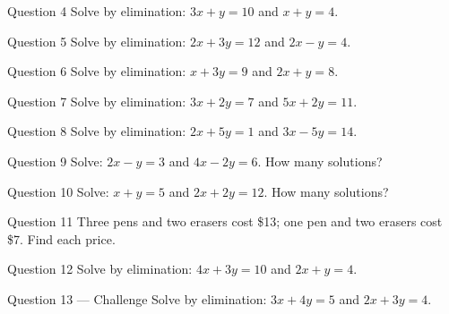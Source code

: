 \documentclass[11pt]{article}
\begin{document}
\begin{qbox}{Question 4}
Solve by elimination: $3x+y=10$ and $x+y=4$.\workspace{2.4cm}
\end{qbox}

\begin{qbox}{Question 5}
Solve by elimination: $2x+3y=12$ and $2x-y=4$.\workspace{2.6cm}
\end{qbox}

\begin{qbox}{Question 6}
Solve by elimination: $x+3y=9$ and $2x+y=8$.\workspace{2.6cm}
\end{qbox}

\begin{qbox}{Question 7}
Solve by elimination: $3x+2y=7$ and $5x+2y=11$.\workspace{2.4cm}
\end{qbox}

\begin{qbox}{Question 8}
Solve by elimination: $2x+5y=1$ and $3x-5y=14$.\workspace{2.4cm}
\end{qbox}

\begin{qbox}{Question 9}
Solve: $2x-y=3$ and $4x-2y=6$. How many solutions?\workspace{2.4cm}
\end{qbox}

\begin{qbox}{Question 10}
Solve: $x+y=5$ and $2x+2y=12$. How many solutions?\workspace{2.4cm}
\end{qbox}

\begin{qbox}{Question 11}
Three pens and two erasers cost \$13; one pen and two erasers cost \$7. Find each price.\workspace{2.8cm}
\end{qbox}

\begin{qbox}{Question 12}
Solve by elimination: $4x+3y=10$ and $2x+y=4$.\workspace{2.6cm}
\end{qbox}

\begin{qbox}{Question 13 --- Challenge}
Solve by elimination: $3x+4y=5$ and $2x+3y=4$.\workspace{3.0cm}
\end{qbox}

\clearpage
{}
\end{document}
